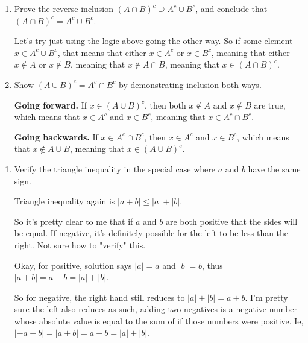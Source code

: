 \documentclass{article}
\numberwithin{equation}{subsection}
\numberwithin{theo}{subsection}
\begin{document}
\begin{enumerate}
\begin{enumerate}
        \item Prove the reverse inclusion $(A \cap B)^c \supseteq A^c \cup B^c$,
            and conclude that $(A \cap B)^c = A^c \cup B^c$.

           Let's try just using the logic above going the other way. So if some
           element $x \in A^c \cup B^c$, that means that either $x \in A^c$ or
           $x \in B^c$, meaning that either $x \notin A$ or $x \notin B$,
           meaning that $x \notin A \cap B$, meaning that $x \in (A \cap B)^c$.


        \item Show $(A \cup B)^c = A^c \cap B^c$ by demonstrating inclusion both
            ways.

            \textbf{Going forward.} If $x \in (A \cup B)^c$, then both $x \notin
            A$ and $x \notin B$ are true, which means that $x \in A^c$ and $x
            \in B^c$, meaning that $x \in A^c \cap B^c$.

            \textbf{Going backwards.} If $x \in A^c \cap B^c$, then $x \in A^c$
            and $x \in B^c$, which means that $x \notin A \cup B$, meaning that
            $x \in (A \cup B)^c$.

        \end{enumerate}

        \begin{enumerate}
            \item Verify the triangle inequality in the special case where $a$
                and $b$ have the same sign.

                Triangle inequality again is $\lvert a + b \rvert \leq \lvert a
                \rvert + \lvert b \rvert$.

                So it's pretty clear to me that if $a$ and $b$ are both positive
                that the sides will be equal. If negative, it's definitely
                possible for the left to be less than the right. Not sure how to
                "verify" this.

                Okay, for positive, solution says $\lvert a \rvert = a$ and
                $\lvert b \rvert = b$, thus $\lvert a + b \rvert = a + b =
                \lvert a \rvert + \lvert b \rvert$.

                So for negative, the right hand still reduces to $\lvert a
                \rvert + \lvert b \rvert = a + b$. I'm pretty sure the left also
                reduces as such, adding two negatives is a negative number whose
                absolute value is equal to the sum of if those numbers were
                positive. Ie, $\lvert -a - b \rvert = \lvert a + b \rvert = a +
                b = \lvert a \rvert + \lvert b \rvert$.


\end{enumerate}
\end{enumerate}
\end{document}
